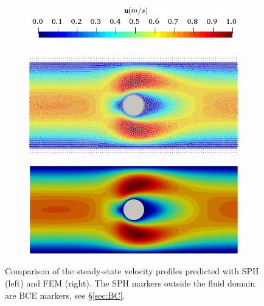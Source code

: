 \begin{figure}[H]
	\centering    
	\begin{subfigure}{0.45\columnwidth}    
		\centering
		\includegraphics[width=1.0\textwidth]{images/FSI_Comparison/FOC_U.png}
	\end{subfigure}
	
	\begin{subfigure}{0.47\columnwidth}    
		\centering
		\includegraphics[width=1.0\textwidth]{images/FSI_Comparison/FOC_SPH_U.png}
	\end{subfigure}
	\begin{subfigure}{0.47\columnwidth}
		\centering
		\includegraphics[width=1.0\textwidth]{images/FSI_Comparison/FOC_FEM_U.png}
	\end{subfigure}
	\caption{Comparison of the steady-state velocity profiles predicted with SPH (left) and FEM (right). The SPH markers outside the fluid domain are BCE markers, see \S\ref{sec:BC}.}    \label{fig:FoCV_fsi}
\end{figure} 
